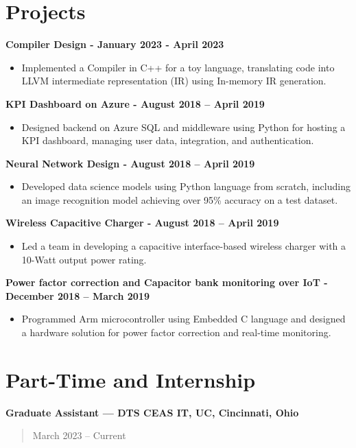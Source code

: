 \documentclass[]{article}
\begin{document}
	\section*{Projects}

	\textbf{Compiler Design - January 2023 - April 2023}
	\begin{itemize}
		\item Implemented a Compiler in C++ for a toy language, translating code into LLVM intermediate representation (IR) using In-memory IR generation.
	\end{itemize}

	\textbf{KPI Dashboard on Azure - August 2018 -- April 2019}
	\begin{itemize}
		\item Designed backend on Azure SQL and middleware using Python for hosting a KPI dashboard, managing user data, integration, and authentication.
	\end{itemize}

	\textbf{Neural Network Design - August 2018 -- April 2019}
	\begin{itemize}
		\item Developed data science models using Python language from scratch, including an image recognition model achieving over 95\% accuracy on a test dataset.
	\end{itemize}

	\textbf{Wireless Capacitive Charger - August 2018 -- April 2019}
	\begin{itemize}
		\item Led a team in developing a capacitive interface-based wireless charger with a 10-Watt output power rating.
	\end{itemize}

	\textbf{Power factor correction and Capacitor bank monitoring over IoT - December 2018 -- March 2019}
	\begin{itemize}
		\item Programmed Arm microcontroller using Embedded C language and designed a hardware solution for power factor correction and real-time monitoring.
	\end{itemize}

	\section*{Part-Time and Internship}

	\textbf{Graduate Assistant --- DTS CEAS IT, UC, Cincinnati, Ohio}
	\begin{quote}
		March 2023 -- Current
	\end{quote}
\end{document}
